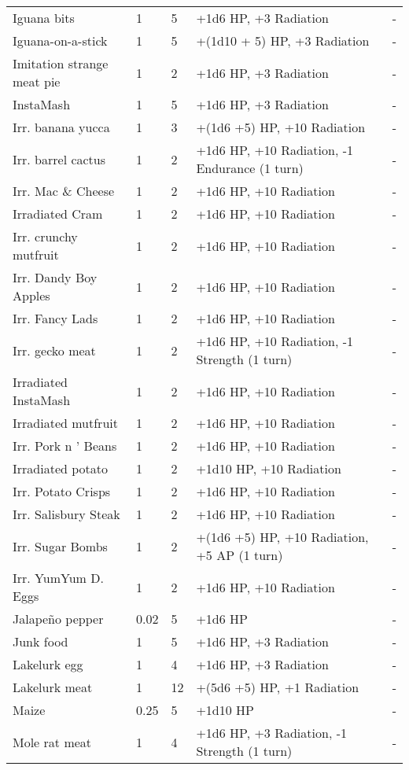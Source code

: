 \documentclass{report}
\begin{document}
\begin{table}[H]
\begin{table}[H]
\begin{table}[H]
\begin{table}[H]
\begin{table}[H]
\begin{table}[H]
\begin{table}[H]
\begin{table}[H]
\begin{table}[H]
\begin{table}[H]
\begin{table}[H]
\begin{table}[H]
\begin{table}[H]
\begin{table}[H]
\begin{table}[H]
\begin{tabular}{p{30mm}p{30mm}p{30mm}p{30mm}p{30mm}}
Iguana bits  & 1 & 5 & +1d6 HP, +3 Radiation  & -  \\
Iguana-on-a-stick  & 1 & 5 & +(1d10 + 5) HP, +3 Radiation  & -  \\
Imitation strange meat pie  & 1 & 2 & +1d6 HP, +3 Radiation  & -  \\
InstaMash  & 1 & 5 & +1d6 HP, +3 Radiation  & -  \\
Irr. banana yucca  & 1 & 3 & +(1d6 +5) HP, +10 Radiation  & -  \\
Irr. barrel cactus  & 1 & 2 & +1d6 HP, +10 Radiation, -1 Endurance (1 turn)  & -  \\
Irr. Mac  \&  Cheese  & 1 & 2 & +1d6 HP, +10 Radiation  & -  \\
Irradiated Cram  & 1 & 2 & +1d6 HP, +10 Radiation  & -  \\
Irr. crunchy mutfruit  & 1 & 2 & +1d6 HP, +10 Radiation  & -  \\
Irr. Dandy Boy Apples  & 1 & 2 & +1d6 HP, +10 Radiation  & -  \\
Irr. Fancy Lads  & 1 & 2 & +1d6 HP, +10 Radiation  & -  \\
Irr. gecko meat  & 1 & 2 & +1d6 HP, +10 Radiation, -1 Strength (1 turn)  & -  \\
Irradiated InstaMash  & 1 & 2 & +1d6 HP, +10 Radiation  & -  \\
Irradiated mutfruit  & 1 & 2 & +1d6 HP, +10 Radiation  & -  \\
Irr. Pork n '  Beans  & 1 & 2 & +1d6 HP, +10 Radiation  & -  \\
Irradiated potato  & 1 & 2 & +1d10 HP, +10 Radiation  & -  \\
Irr. Potato Crisps  & 1 & 2 & +1d6 HP, +10 Radiation  & -  \\
Irr. Salisbury Steak  & 1 & 2 & +1d6 HP, +10 Radiation  & -  \\
Irr. Sugar Bombs  & 1 & 2 & +(1d6 +5) HP, +10 Radiation, +5 AP (1 turn)  & -  \\
Irr. YumYum D. Eggs  & 1 & 2 & +1d6 HP, +10 Radiation  & -  \\
Jalapeño pepper  & 0.02  & 5 & +1d6 HP  & -  \\
Junk food  & 1 & 5 & +1d6 HP, +3 Radiation  & -  \\
Lakelurk egg  & 1 & 4 & +1d6 HP, +3 Radiation  & -  \\
Lakelurk meat  & 1 & 12 & +(5d6 +5) HP, +1 Radiation  & -  \\
Maize  & 0.25  & 5 & +1d10 HP & -  \\
Mole rat meat  & 1 & 4 & +1d6 HP, +3 Radiation, -1 Strength (1 turn)  & -  \\

\end{tabular}
\end{table}
\end{table}
\end{table}
\end{table}
\end{table}
\end{table}
\end{table}
\end{table}
\end{table}
\end{table}
\end{table}
\end{table}
\end{table}
\end{table}
\end{table}
\end{document}
